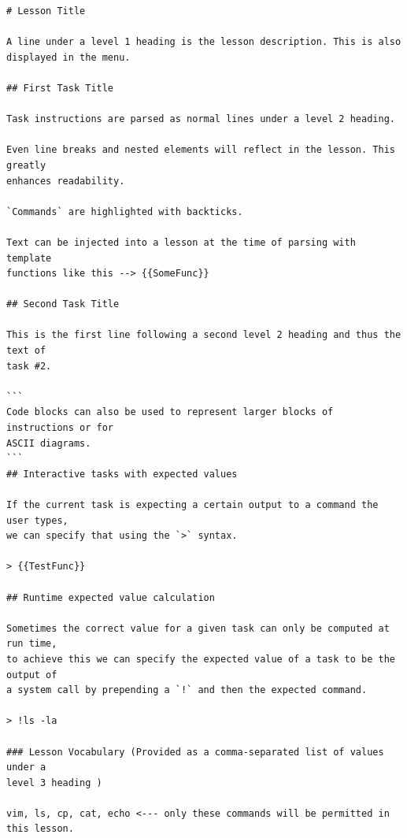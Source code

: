 \begin{lstlisting}[float=htbp, frame=single, language={}, label=lst:markdown, caption=Specification for Markdown lesson files.]
# Lesson Title

A line under a level 1 heading is the lesson description. This is also
displayed in the menu.

## First Task Title

Task instructions are parsed as normal lines under a level 2 heading.

Even line breaks and nested elements will reflect in the lesson. This greatly
enhances readability.

`Commands` are highlighted with backticks.

Text can be injected into a lesson at the time of parsing with template
functions like this --> {{SomeFunc}}

## Second Task Title

This is the first line following a second level 2 heading and thus the text of
task #2.

```
Code blocks can also be used to represent larger blocks of instructions or for
ASCII diagrams.
```
## Interactive tasks with expected values

If the current task is expecting a certain output to a command the user types,
we can specify that using the `>` syntax.

> {{TestFunc}}

## Runtime expected value calculation

Sometimes the correct value for a given task can only be computed at run time,
to achieve this we can specify the expected value of a task to be the output of
a system call by prepending a `!` and then the expected command.

> !ls -la

### Lesson Vocabulary (Provided as a comma-separated list of values under a
level 3 heading )

vim, ls, cp, cat, echo <--- only these commands will be permitted in this lesson.

\end{lstlisting}

